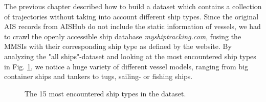 The previous chapter described how to build a dataset which contains a collection of trajectories without taking into account different ship types. Since the original AIS records from AISHub do not include the static information of vessels, we had to crawl the openly accessible ship database \textit{myshiptracking.com}, fusing the MMSIs with their corresponding ship type as defined by the website. By analyzing the "all ships"-dataset and looking at the most encountered ship types in Fig. \ref{fig:shipTypes}, we notice a huge variety of different vessel models, ranging from big container ships and tankers to tugs, sailing- or fishing ships.

\begin{figure}[H]
    \centering
    
    \caption{The 15 most encountered ship types in the dataset.}
    \label{fig:shipTypes}
\end{figure}

